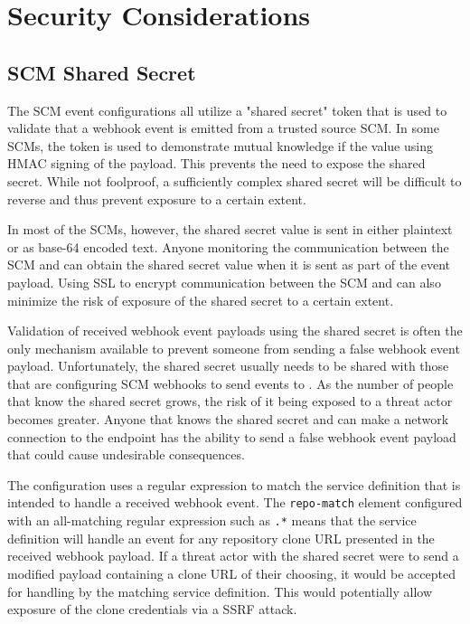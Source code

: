 \chapter{\cxoneflowtext\space Security Considerations}\label{sec:cxoneflow-security}


\section{SCM Shared Secret}

The SCM event configurations all utilize a "shared secret" token that is used to validate that
a webhook event is emitted from a trusted source SCM.  In some SCMs, the token is used to
demonstrate mutual knowledge if the value using HMAC signing of the payload.  This prevents
the need to expose the shared secret.  While not foolproof, a sufficiently complex shared
secret will be difficult to reverse and thus prevent exposure to a certain extent.

In most of the SCMs, however, the shared secret value is sent in either plaintext or as base-64 
encoded text.  Anyone monitoring the communication between the SCM and \cxoneflow can obtain
the shared secret value when it is sent as part of the event payload.  Using SSL to encrypt
communication between the SCM and \cxoneflow can also minimize the risk of exposure
of the shared secret to a certain extent.

Validation of received webhook event payloads using the shared secret is often the only mechanism
available to prevent someone from sending a false webhook event payload.
Unfortunately, the shared secret usually needs to be shared with those that are configuring
SCM webhooks to send events to \cxoneflow.  As the number of people that know the shared secret
grows, the risk of it being exposed to a threat actor becomes greater.  Anyone that knows
the shared secret and can make a network connection to the \cxoneflow endpoint has the ability
to send a false webhook event payload that could cause undesirable consequences.

The \cxoneflow configuration uses a regular expression to match the service definition
that is intended to handle a received webhook event.  The \texttt{repo-match} element
configured with an all-matching regular expression such as \texttt{.*} means that the
service definition will handle an event for any repository clone URL presented in the
received webhook payload.  If a threat actor with the shared secret were to send a modified payload
containing a clone URL of their choosing, it would be accepted for handling by
the matching service definition.  This would potentially allow exposure of the
clone credentials via a SSRF attack.

